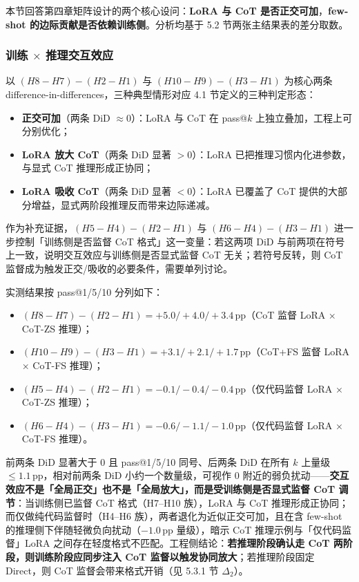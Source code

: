 
本节回答第四章矩阵设计的两个核心设问：\textbf{LoRA 与 CoT 是否正交可加}，\textbf{few-shot 的边际贡献是否依赖训练侧}。分析均基于 5.2 节两张主结果表的差分取数。

\subsubsection{训练 $\times$ 推理交互效应}
以 $(H8 - H7) - (H2 - H1)$ 与 $(H10 - H9) - (H3 - H1)$ 为核心两条 difference-in-differences，三种典型情形对应 4.1 节定义的三种判定形态：
\begin{itemize}
    \item \textbf{正交可加}（两条 DiD $\approx 0$）：LoRA 与 CoT 在 pass@$k$ 上独立叠加，工程上可分别优化；
    \item \textbf{LoRA 放大 CoT}（两条 DiD 显著 $> 0$）：LoRA 已把推理习惯内化进参数，与显式 CoT 推理形成正协同；
    \item \textbf{LoRA 吸收 CoT}（两条 DiD 显著 $< 0$）：LoRA 已覆盖了 CoT 提供的大部分增益，显式两阶段推理反而带来边际递减。
\end{itemize}
作为补充证据，$(H5 - H4) - (H2 - H1)$ 与 $(H6 - H4) - (H3 - H1)$ 进一步控制「训练侧是否监督 CoT 格式」这一变量：若这两项 DiD 与前两项在符号上一致，说明交互效应与训练侧是否显式监督 CoT 无关；若符号反转，则 CoT 监督成为触发正交/吸收的必要条件，需要单列讨论。

实测结果按 pass@1/5/10 分列如下：
\begin{itemize}
    \item $(H8-H7)-(H2-H1) = +5.0 / +4.0 / +3.4$\,pp（CoT 监督 LoRA × CoT-ZS 推理）；
    \item $(H10-H9)-(H3-H1) = +3.1 / +2.1 / +1.7$\,pp（CoT+FS 监督 LoRA × CoT-FS 推理）；
    \item $(H5-H4)-(H2-H1) = -0.1 / -0.4 / -0.4$\,pp（仅代码监督 LoRA × CoT-ZS 推理）；
    \item $(H6-H4)-(H3-H1) = -0.6 / -1.1 / -1.0$\,pp（仅代码监督 LoRA × CoT-FS 推理）。
\end{itemize}
前两条 DiD 显著大于 0 且 pass@1/5/10 同号、后两条 DiD 在所有 $k$ 上量级 $\le 1.1$\,pp，相对前两条 DiD 小约一个数量级，可视作 0 附近的弱负扰动——\textbf{交互效应不是「全局正交」也不是「全局放大」，而是受训练侧是否显式监督 CoT 调节}：当训练侧已监督 CoT 格式（H7--H10 族），LoRA 与 CoT 推理形成正协同；而仅做纯代码监督时（H4--H6 族），两者退化为近似正交可加，且在含 few-shot 的推理侧下伴随轻微负向扰动（$-1.0$\,pp 量级），暗示 CoT 推理示例与「仅代码监督」LoRA 之间存在轻度格式不匹配。工程侧结论：\textbf{若推理阶段确认走 CoT 两阶段，则训练阶段应同步注入 CoT 监督以触发协同放大}；若推理阶段固定 Direct，则 CoT 监督会带来格式开销（见 5.3.1 节 $\Delta_2$）。

